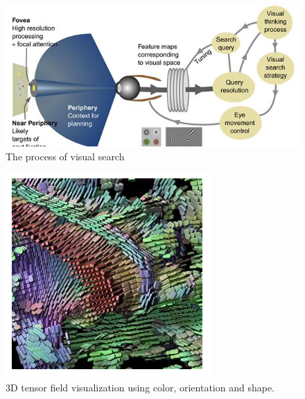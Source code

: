 \begin{mdframed}\begin{multicols}{2}
    \begin{figure}[H]
        \centering
        \includegraphics[width=\linewidth]{visual_search.png}
        \caption{The process of visual search}
    \end{figure}
    \begin{figure}[H]
        \centering
        \includegraphics[width=0.6\linewidth]{tensor_vis.png}
        \caption{3D tensor field visualization using color, orientation and
        shape.}
    \end{figure}


\end{multicols}\end{mdframed}


